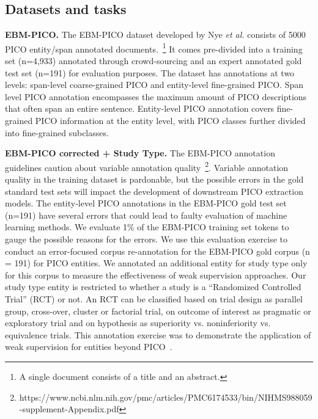 \documentclass[10.7pt,]{article}
\begin{document}
\subsection{Datasets and tasks}\label{data}
%
\textbf{EBM-PICO.}
The EBM-PICO dataset developed by Nye \textit{et al.} consists of 5000 PICO entity/span annotated documents.~\footnote{A single document consists of a title and an abstract.}
It comes pre-divided into a training set (n=4,933) annotated through crowd-sourcing and an expert annotated gold test set (n=191) for evaluation purposes.
The dataset has annotations at two levels: span-level coarse-grained PICO and entity-level fine-grained PICO.
Span level PICO annotation encompasses the maximum amount of PICO descriptions that often span an entire sentence.
Entity-level PICO annotation covers fine-grained PICO information at the entity level, with PICO classes further divided into fine-grained subclasses.



\textbf{EBM-PICO corrected + Study Type.}
The EBM-PICO annotation guidelines caution about variable annotation quality~\footnote{https://www.ncbi.nlm.nih.gov/pmc/articles/PMC6174533/bin/NIHMS988059-supplement-Appendix.pdf}.
Variable annotation quality in the training dataset is pardonable, but the possible errors in the gold standard test sets will impact the development of downstream PICO extraction models.
The entity-level PICO annotations in the EBM-PICO gold test set (n=191) have several errors that could lead to faulty evaluation of machine learning methods.
We evaluate 1\% of the EBM-PICO training set tokens to gauge the possible reasons for the errors.
We use this evaluation exercise to conduct an error-focused corpus re-annotation for the EBM-PICO gold corpus (n = 191) for PICO entities.
We annotated an additional entity for study type only for this corpus to measure the effectiveness of weak supervision approaches.
Our study type entity is restricted to whether a study is a ``Randomized Controlled Trial'' (RCT) or not.
An RCT can be classified based on trial design as parallel group, cross-over, cluster or factorial trial, on outcome of interest as pragmatic or exploratory trial and on hypothesis as superiority vs. noninferiority vs. equivalence trials.
This annotation exercise was to demonstrate the application of weak supervision for entities beyond PICO~\cite{menard2019turning}.
\end{document}
